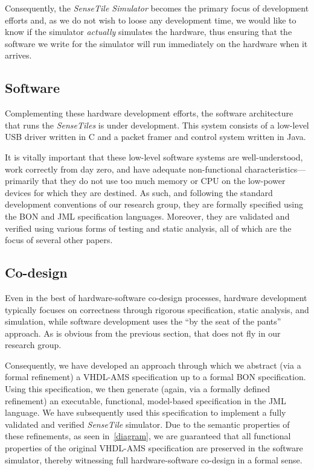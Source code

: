 \documentclass{article}
\newcommand{\ST}{\emph{SenseTile}\xspace}
\newcommand{\STs}{\emph{SenseTiles}\xspace}
\newcommand{\STS}{\emph{SenseTile Simulator}\xspace}
\begin{document}
Consequently, the \STS becomes the primary focus of development
efforts and, as we do not wish to loose any development time, we would
like to know if the simulator \emph{actually} simulates the hardware,
thus ensuring that the software we write for the simulator will run
immediately on the hardware when it arrives.

\subsection{Software}
\label{subsec:software}

Complementing these hardware development efforts, the software
architecture that runs the \STs is under development.  This system
consists of a low-level USB driver written in C and a packet framer
and control system written in Java.

It is vitally important that these low-level software systems are
well-understood, work correctly from day zero, and have adequate
non-functional characteristics---primarily that they do not use too
much memory or CPU on the low-power devices for which they are
destined.  As such, and following the standard development conventions
of our research group, they are formally specified using the BON and
JML specification languages.  Moreover, they are validated and
verified using various forms of testing and static analysis, all of
which are the focus of several other papers.

\subsection{Co-design}
\label{subsec:co-design}

Even in the best of hardware-software co-design processes, hardware
development typically focuses on correctness through rigorous
specification, static analysis, and simulation, while software
development uses the ``by the seat of the pants'' approach.  As is
obvious from the previous section, that does not fly in our research
group.

Consequently, we have developed an approach through which we abstract
(via a formal refinement) a VHDL-AMS specification up to a formal BON
specification.  Using this specification, we then generate (again, via
a formally defined refinement) an executable, functional, model-based
specification in the JML language.  We have subsequently used this
specification to implement a fully validated and verified \ST
simulator.  Due to the semantic properties of these refinements, as
seen in~\autoref{diagram}, we are guaranteed that all functional
properties of the original VHDL-AMS specification are preserved in the
software simulator, thereby witnessing full hardware-software
co-design in a formal sense.
\end{document}
